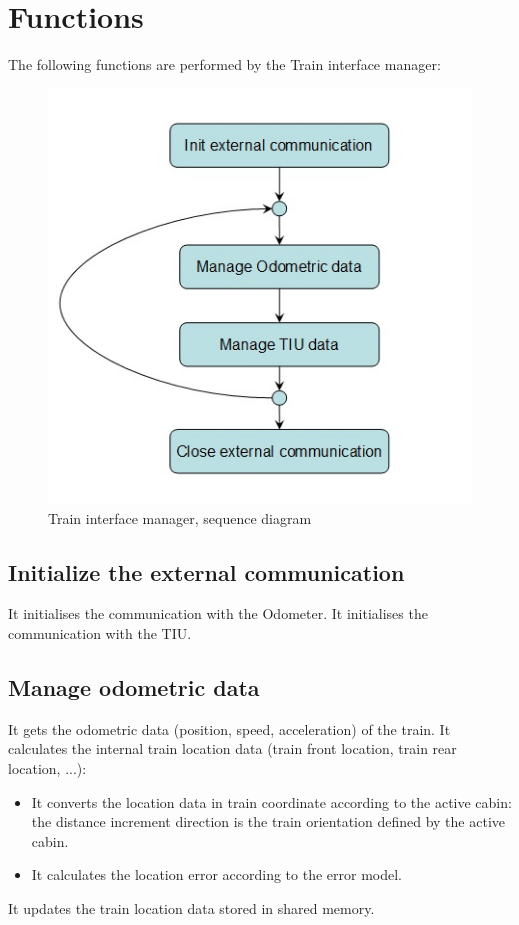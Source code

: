 \documentclass[nocc]{template/openetcs_report}
\begin{document}
\section{Functions}
The following functions are performed by the Train interface manager:
\begin{figure}[!h]
  \centering
  \includegraphics[width=\textwidth]{image/evc_train_interf_manager}
  \caption{Train interface manager, sequence diagram}
  \label{Train interface manager, sequence diagram}
\end{figure}

\subsection{Initialize the external communication}
It initialises the communication with the Odometer.
It initialises the communication with the TIU.
\subsection{Manage odometric data}
It gets the odometric data (position, speed, acceleration) of the train.
It calculates the internal train location data (train front location, train rear location, ...):
\begin{itemize}
	\item It converts the location data in train coordinate according to the active cabin: the distance increment direction is the train orientation defined by the active cabin.
	\item It calculates the location error according to the error model.
\end{itemize} 
It updates the train location data stored in shared memory.
\end{document}
